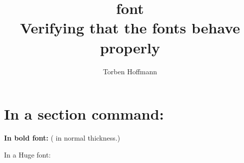 \documentclass[11pt,twocolumn]{article}
\title{font\\Verifying that the fonts behave properly}
\author{Torben Hoffmann }
\begin{document}
\parindent=0pt

\maketitle


\section{In a section command: \counterplay}

\textbf{In bold font:\counterplay} (\counterplay
in normal thickness.)

{\Huge In a Huge font: \counterplay}
\end{document}
